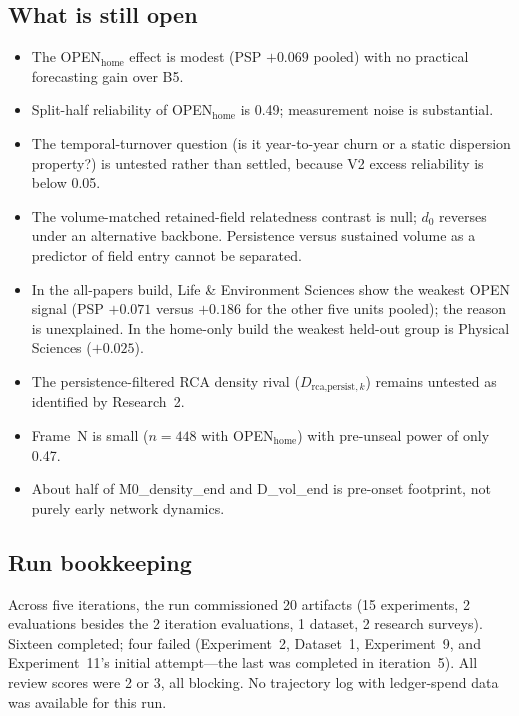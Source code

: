\documentclass[11pt,letterpaper]{article}
\begin{document}
\subsection{What is still open}

\begin{itemize}
    \item The OPEN$_{\text{home}}$ effect is modest (PSP $+0.069$ pooled) with no practical forecasting gain over B5.
    \item Split-half reliability of OPEN$_{\text{home}}$ is 0.49; measurement noise is substantial.
    \item The temporal-turnover question (is it year-to-year churn or a static dispersion property?) is untested rather than settled, because V2 excess reliability is below 0.05.
    \item The volume-matched retained-field relatedness contrast is null; $d_0$ reverses under an alternative backbone. Persistence versus sustained volume as a predictor of field entry cannot be separated.
    \item In the all-papers build, Life \& Environment Sciences show the weakest OPEN signal (PSP $+0.071$ versus $+0.186$ for the other five units pooled); the reason is unexplained. In the home-only build the weakest held-out group is Physical Sciences ($+0.025$).
    \item The persistence-filtered RCA density rival ($D_{\text{rca,persist},k}$) remains untested as identified by Research~2.
    \item Frame~N is small ($n = 448$ with OPEN$_{\text{home}}$) with pre-unseal power of only 0.47.
    \item About half of M0\_density\_end and D\_vol\_end is pre-onset footprint, not purely early network dynamics.
\end{itemize}

\subsection{Run bookkeeping}

Across five iterations, the run commissioned 20 artifacts (15 experiments, 2 evaluations besides the 2 iteration evaluations, 1 dataset, 2 research surveys). Sixteen completed; four failed (Experiment~2, Dataset~1, Experiment~9, and Experiment~11's initial attempt---the last was completed in iteration~5). All review scores were 2 or 3, all blocking. No trajectory log with ledger-spend data was available for this run.
\end{document}
